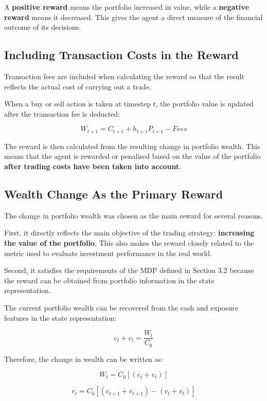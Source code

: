 A \textbf{positive reward} means the portfolio increased in value, while
a \textbf{negative reward} means it decreased. This gives the agent a
direct measure of the financial outcome of its decisions.

\subsection{Including Transaction Costs in the Reward}

Transaction fees are included when calculating the reward so that the
result reflects the actual cost of carrying out a trade.

When a buy or sell action is taken at timestep \(t\), the portfolio
value is updated after the transaction fee is deducted:

\[W_{t + 1} = C_{t + 1} + h_{t + 1}P_{t + 1} - Fees\]

The reward is then calculated from the resulting change in portfolio
wealth. This means that the agent is rewarded or penalised based on the
value of the portfolio \textbf{after trading costs have been taken into
account}.

\subsection{Wealth Change As the Primary Reward}

The change in portfolio wealth was chosen as the main reward for several
reasons.

First, it directly reflects the main objective of the trading strategy:
\textbf{increasing the value of the portfolio}. This also makes the
reward closely related to the metric used to evaluate investment
performance in the real world.

Second, it satisfies the requirements of the MDP defined in Section 3.2
because the reward can be obtained from portfolio information in the
state representation.

The current portfolio wealth can be recovered from the cash and exposure
features in the state representation:

\[c_{t} + v_{t} = \frac{W_{t}}{C_{0}}\]

Therefore, the change in wealth can be written as:

\[W_{t} = C_{0}\left\lbrack \left( c_{t} + v_{t} \right) \right\rbrack\]

\[r_{t} = C_{0}\left\lbrack \left( c_{t + 1} + v_{t + 1} \right) - \left( c_{t} + v_{t} \right) \right\rbrack\]

